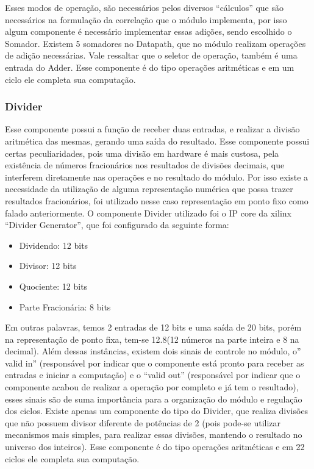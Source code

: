 Esses modos de operação, são necessários pelos diversos “cálculos” que são necessários na formulação da correlação que o módulo implementa, por isso algum componente é necessário implementar essas adições, sendo escolhido o Somador.
Existem 5 somadores no Datapath, que no módulo realizam operações de adição necessárias. Vale ressaltar que o seletor de operação, também é uma entrada do Adder. Esse componente é do tipo operações aritméticas e em um ciclo ele completa sua computação.
\subsubsection{Divider}
Esse componente possui a função de receber duas entradas, e realizar a divisão aritmética das mesmas, gerando uma saída do resultado. Esse componente possui certas peculiaridades, pois uma divisão em hardware é mais custosa, pela existência de números fracionários nos resultados de divisões decimais, que interferem diretamente nas operações e no resultado do módulo. Por isso existe a necessidade da utilização de alguma representação numérica que possa trazer resultados fracionários, foi utilizado nesse caso representação em ponto fixo como falado anteriormente. O componente Divider utilizado foi o IP core da xilinx “Divider Generator”, que foi configurado da seguinte forma: 
\begin{itemize}
\item 	Dividendo: 12 bits
\item 	Divisor: 12 bits
\item 	Quociente: 12 bits
\item 	Parte Fracionária: 8 bits
\end{itemize}
Em outras palavras, temos 2 entradas de 12 bits e uma saída de 20 bits, porém na representação de ponto fixa, tem-se 12.8(12 números na parte inteira e 8 na decimal). Além dessas instâncias, existem dois sinais de controle no módulo, o” valid in” (responsável por indicar que o componente está pronto para receber as entradas e iniciar a computação) e o “valid out” (responsável por indicar que o componente acabou de realizar a operação por completo e já tem o resultado), esses sinais são de suma importância para a organização do módulo e regulação dos ciclos. Existe apenas um componente do tipo do Divider, que realiza divisões que não possuem divisor diferente de potências de 2 (pois pode-se utilizar mecanismos mais simples, para realizar essas divisões, mantendo o resultado no universo dos inteiros).  Esse componente é do tipo operações aritméticas e em 22 ciclos ele completa sua computação.
